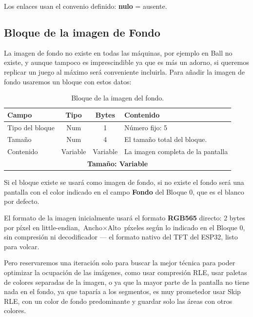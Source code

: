 Los enlaces usan el convenio definido: \textbf{nulo} = ausente.

\subsection{Bloque de la imagen de Fondo}
\label{sec:F5I2Fondo}

La imagen de fondo no existe en todas las máquinas, por ejemplo en Ball no existe, y aunque tampoco es imprescindible ya que es más un adorno, si queremos replicar un juego al máximo será conveniente incluirla. Para añadir la imagen de fondo usaremos un bloque con estos datos:

\begin{table}[H]
	\centering
	\begin{tabular}{|l|c|c|p{8.4cm}|}
		\hline
		\textbf{Campo} & \textbf{Tipo} & \textbf{Bytes} & \textbf{Contenido} \\
		\hline
		
		Tipo del bloque & Num & 1 & Número fijo: 5 \\ \hline
		
		Tamaño & Num & 4 & El tamaño total del bloque. \\ \hline
		
		Contenido & Variable & Variable & La imagen completa de la pantalla \\
		
		\hline\hline
		\multicolumn{4}{c}{\textbf{Tamaño: Variable}} \\ \hline
	\end{tabular}
	\caption{Bloque de la imagen del fondo.}
\end{table}

Si el bloque existe se usará como imagen de fondo, si no existe el fondo será una pantalla con el color indicado en el campo \textbf{Fondo} del Bloque 0, que es el blanco por defecto.

El formato de la imagen inicialmente usará el formato \textbf{RGB565} directo: 2 bytes por píxel en little-endian, $\text{Ancho} \times \text{Alto}$ píxeles según lo indicado en el Bloque 0, sin compresión ni decodificador — el formato nativo del TFT del ESP32, listo para volcar.

Pero reservaremos una iteración solo para buscar la mejor técnica para poder optimizar la ocupación de las imágenes, como usar compresión RLE, usar paletas de colores separadas de la imagen, o ya que la mayor parte de la pantalla no tiene nada en el fondo, ya que taparía a los segmentos, es muy prometedor usar Skip RLE, con un color de fondo predominante y guardar solo las áreas con otros colores.

